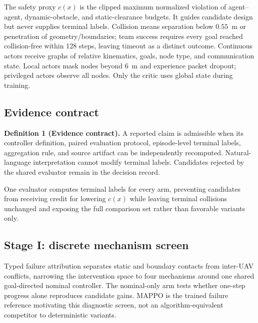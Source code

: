 \documentclass{article}
\begin{document}
The safety proxy $c(x)$ is the clipped maximum normalized violation of agent--agent, dynamic-obstacle, and static-clearance budgets. It guides candidate design but never supplies terminal labels. Collision means separation below $0.55$~m or penetration of geometry/boundaries; team success requires every goal reached collision-free within 128 steps, leaving timeout as a distinct outcome. Continuous actors receive graphs of relative kinematics, goals, node type, and communication state. Local actors mask nodes beyond 6~m and experience packet dropout; privileged actors observe all nodes. Only the critic uses global state during training.

\subsection{Evidence contract}
\noindent\textbf{Definition 1 (Evidence contract).} A reported claim is admissible when its controller definition, paired evaluation protocol, episode-level terminal labels, aggregation rule, and source artifact can be independently recomputed. Natural-language interpretation cannot modify terminal labels. Candidates rejected by the shared evaluator remain in the decision record.

One evaluator computes terminal labels for every arm, preventing candidates from receiving credit for lowering $c(x)$ while leaving terminal collisions unchanged and exposing the full comparison set rather than favorable variants only.

\subsection{Stage I: discrete mechanism screen}
Typed failure attribution separates static and boundary contacts from inter-UAV conflicts, narrowing the intervention space to four mechanisms around one shared goal-directed nominal controller. The nominal-only arm tests whether one-step progress alone reproduces candidate gains. MAPPO is the trained failure reference motivating this diagnostic screen, not an algorithm-equivalent competitor to deterministic variants.
\end{document}
